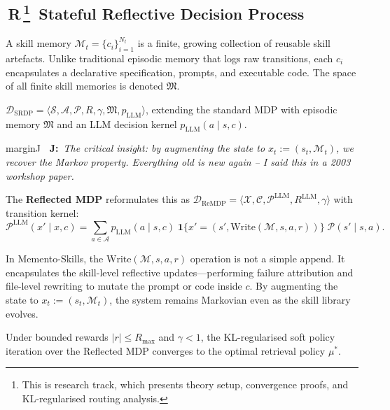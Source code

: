 \documentclass[11pt,a4paper]{article}
\newcommand{\profJ}[1]{%
  \begin{inlinenote}{marginJ}%
  \textbf{\color{marginJ}\faGraduationCap~J:}~\textit{#1}%
  \end{inlinenote}%
}
\newcommand{\Rtag}{{\sffamily\bfseries\colorbox{theoryBG}{\color{trackR}\,R\,}}}
\begin{document}
\subsection[\Rtag~Stateful Reflective Decision Process]{\Rtag\footnote{This is research track, which presents theory setup, convergence proofs, and KL-regularised routing analysis.}~Stateful Reflective Decision Process}
\label{sec:formal setup}


\begin{theorytrack}

\begin{definition}
A skill memory $\mathcal{M}_t = \{c_i\}_{i=1}^{N_t}$ is a finite, growing collection of reusable skill artefacts. Unlike traditional episodic memory that logs raw transitions, each $c_i$ encapsulates a declarative specification, prompts, and executable code. The space of all finite skill memories is denoted $\mathfrak{M}$.
\end{definition}

\begin{definition}[SRDP]
\label{def:srdp}
$\mathcal{D}_{\mathrm{SRDP}} = \langle \mathcal{S}, \mathcal{A}, \mathcal{P}, R, \gamma, \mathfrak{M}, p_{\mathrm{LLM}} \rangle$, extending the standard MDP with episodic memory $\mathfrak{M}$ and an LLM decision kernel $p_{\mathrm{LLM}}(a \mid s, c)$.
\end{definition}

\profJ{The critical insight: by augmenting the state to $x_t := (s_t, \mathcal{M}_t)$, we recover the Markov property. Everything old is new again -- I said this in a 2003 workshop paper.}

The \textbf{Reflected MDP} reformulates this as $\mathcal{D}_{\mathrm{ReMDP}} = \langle \mathcal{X}, \mathcal{C}, \mathcal{P}^{\mathrm{LLM}}, R^{\mathrm{LLM}}, \gamma \rangle$ with transition kernel:
\begin{equation}
  \mathcal{P}^{\mathrm{LLM}}(x' \mid x, c) = \sum_{a \in \mathcal{A}} p_{\mathrm{LLM}}(a \mid s, c)\; \mathbf{1}\{x' = (s', \mathrm{Write}(\mathcal{M}, s, a, r))\}\; \mathcal{P}(s' \mid s, a).
\end{equation}

In Memento-Skills, the $\mathrm{Write}(\mathcal{M}, s, a, r)$ operation is not a simple append. It encapsulates the skill-level reflective updates—performing failure attribution and file-level rewriting to mutate the prompt or code inside $c$. By augmenting the state to $x_t := (s_t,\mathcal{M}_t)$, the system remains Markovian even as the skill library evolves. 

\begin{keyresult}
\begin{theorem}
\label{thm:convergence}
Under bounded rewards $|r| \leq R_{\max}$ and $\gamma < 1$, the KL-regularised soft policy iteration over the Reflected MDP converges to the optimal retrieval policy $\mu^*$.
\end{theorem}
\end{keyresult}
\end{theorytrack}
\end{document}
